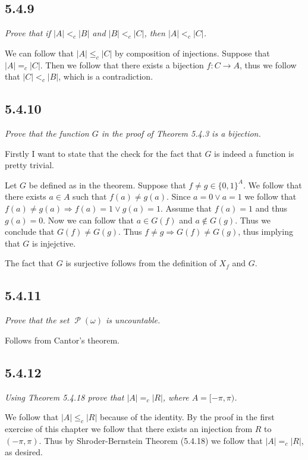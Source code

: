 \documentclass[11pt,oneside,titlepage]{book}
\DeclareMathOperator \pow {\mathcal {P}}
\DeclareMathOperator \ra {\Rightarrow}
\begin{document}
\subsection*{5.4.9}

\textit{Prove that if $|A| <_c |B|$ and $|B| <_c |C|$, then $|A| <_c |C|$.}

We can follow that $|A| \leq_c |C|$ by composition of injections. Suppose that
$|A| =_c |C|$. Then we follow that there exists a bijection $f: C \to A$, thus
we follow that $|C| <_c |B|$, which is a contradiction.

\subsection*{5.4.10}

\textit{Prove that the function $G$ in the proof of Theorem 5.4.3 is a bijection.}

Firstly I want to state that the check for the fact that $G$ is indeed a function is pretty
trivial.

Let $G$ be defined as in the theorem. Suppose that $f \neq g \in \{0, 1\}^A$. We follow that
there exists $a \in A$ such that $f(a) \neq g(a)$. Since $a = 0 \lor a = 1$ we
follow that $f(a) \neq g(a) \ra f(a) = 1 \lor g(a) = 1$. Assume that $f(a) = 1$ and thus
$g(a) = 0$. Now we can follow that $a \in G(f)$ and $a \notin G(g)$. Thus we conclude that
$G(f) \neq G(g)$. Thus $f \neq g \ra G(f) \neq G(g)$, thus implying that $G$ is injejctive.

The fact that $G$ is surjective follows from the definition of $X_f$ and $G$.

\subsection*{5.4.11}

\textit{Prove that the set $\pow(\omega)$ is uncountable.}

Follows from Cantor's theorem.

\subsection*{5.4.12}

\textit{Using Theorem 5.4.18 prove that $|A| =_c |R|$, where $A = [-\pi, \pi)$.}

We follow that $|A| \leq_c |R|$ because of the identity. By the proof in the first exercise
of this chapter we follow that there exists an injection from  $R$ to $(-\pi, \pi)$. Thus
by Shroder-Bernstein Theorem (5.4.18) we follow that $|A| =_c |R|$, as desired.
\end{document}
